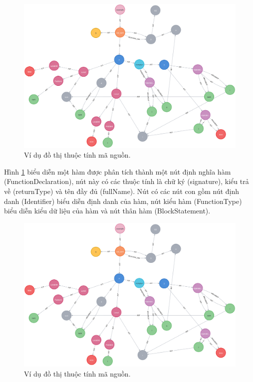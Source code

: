 \begin{figure}[H]
  \includegraphics[width=1\columnwidth]{figures/c2/c2_cpg.png}
  \centering
  \caption{Ví dụ đồ thị thuộc tính mã nguồn.}
  \label{img:c3_temp1}
\end{figure}

Hình \ref{img:c3_temp1} biểu diễn một hàm được phân tích thành một nút định nghĩa hàm (FunctionDeclaration), nút này có các thuộc tính là chữ ký (signature), kiểu trả về (returnType) và tên đầy đủ (fullName).
Nút có các nút con gồm nút định danh (Identifier) biểu diễn định danh của hàm, nút kiểu hàm (FunctionType) biểu diễn kiểu dữ liệu của hàm và nút thân hàm (BlockStatement).

\begin{figure}[H]
  \includegraphics[width=1\columnwidth]{figures/c2/c2_cpg.png}
  \centering
  \caption{Ví dụ đồ thị thuộc tính mã nguồn.}
  \label{img:c3_temp2}
\end{figure}

